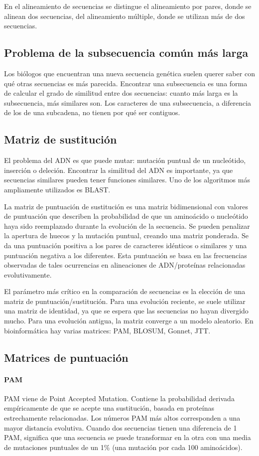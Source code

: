 En el alineamiento de secuencias se distingue el alineamiento por pares, donde se alinean dos secuencias, del alineamiento múltiple, donde se utilizan más de dos secuencias. 

\subsection{Problema de la subsecuencia común más larga}
Los biólogos que encuentran una nueva secuencia genética suelen querer saber con qué otras secuencias es más parecida. Encontrar una subsecuencia es una forma de calcular el grado de similitud entre dos secuencias: cuanto más larga es la subsecuencia, más similares son. Los caracteres de una subsecuencia, a diferencia de los de una subcadena, no tienen por qué ser contiguos.

\subsection{Matriz de sustitución}
El problema del ADN es que puede mutar: mutación puntual de un nucleótido, inserción o deleción. Encontrar la similitud del ADN es importante, ya que secuencias similares pueden tener funciones similares. Uno de los algoritmos más ampliamente utilizados es BLAST. 

La matriz de puntuación de sustitución es una matriz bidimensional con valores de puntuación que describen la probabilidad de que un aminoácido o nucleótido haya sido reemplazado durante la evolución de la secuencia. Se pueden penalizar la apertura de huecos y la mutación puntual, creando una matriz ponderada. Se da una puntuación positiva a los pares de caracteres idénticos o similares y una puntuación negativa a los diferentes. Esta puntuación se basa en las frecuencias observadas de tales ocurrencias en alineaciones de ADN/proteínas relacionadas evolutivamente.

El parámetro más crítico en la comparación de secuencias es la elección de una matriz de puntuación/sustitución. Para una evolución reciente, se suele utilizar una matriz de identidad, ya que se espera que las secuencias no hayan divergido mucho. Para una evolución antigua, la matriz converge a un modelo aleatorio. En bioinformática hay varias matrices: PAM, BLOSUM, Gonnet, JTT.

\subsection{Matrices de puntuación}
\paragraph{PAM}
PAM viene de Point Accepted Mutation. Contiene la probabilidad derivada empíricamente de que se acepte una sustitución, basada en proteínas estrechamente relacionadas. Los números PAM más altos corresponden a una mayor distancia evolutiva. Cuando dos secuencias tienen una diferencia de 1 PAM, significa que una secuencia se puede transformar en la otra con una media de mutaciones puntuales de un 1\% (una mutación por cada 100 aminoácidos).

